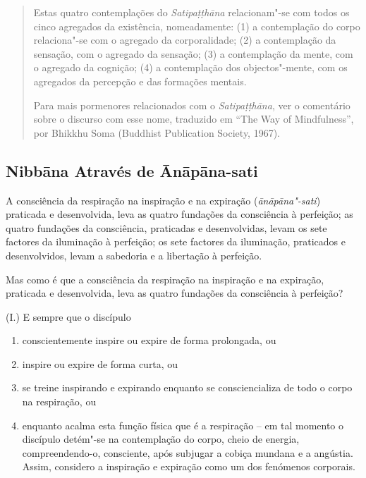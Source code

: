 \begin{quote}
  Estas quatro contemplações do \emph{Satipa\d{t}\d{t}hāna} relacionam"-se com
  todos os cinco agregados da existência, nomeadamente: (1) a contemplação do
  corpo relaciona"-se com o agregado da corporalidade; (2) a contemplação da
  sensação, com o agregado da sensação; (3) a contemplação da mente, com o
  agregado da cognição; (4) a contemplação dos objectos"-mente, com os agregados
  da percepção e das formações mentais.

  Para mais pormenores relacionados com o \emph{Satipa\d{t}\d{t}hāna}, ver o
  comentário sobre o discurso com esse nome, traduzido em “The Way of
  Mindfulness”, por Bhikkhu Soma (Buddhist Publication Society, 1967).
\end{quote}

\subsection{Nibbāna Através de Ānāpāna-sati}

A consciência da respiração na inspiração e na expiração (\emph{ānāpāna"-sati})
praticada e desenvolvida, leva as quatro fundações da consciência à perfeição;
as quatro fundações da consciência, praticadas e desenvolvidas, levam os sete
factores da iluminação à perfeição; os sete factores da iluminação, praticados e
desenvolvidos, levam a sabedoria e a libertação à perfeição.

Mas como é que a consciência da respiração na inspiração e na expiração,
praticada e desenvolvida, leva as quatro fundações da consciência à perfeição?

(I.) E sempre que o discípulo

\begin{enumerate}
  \item conscientemente inspire ou expire de forma prolongada, ou

  \item inspire ou expire de forma curta, ou

  \item se treine inspirando e expirando enquanto se consciencializa de todo o
        corpo na respiração, ou

  \item enquanto acalma esta função física que é a respiração -- em tal momento o
        discípulo detém"-se na contemplação do corpo, cheio de energia,
        compreendendo-o, consciente, após subjugar a cobiça mundana e a
        angústia. Assim, considero a inspiração e expiração como um dos
        fenómenos corporais.
\end{enumerate}

